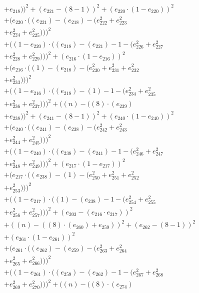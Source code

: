 \documentclass[10pt, a4paper]{article}
\begin{document}
\begin{small}
\begin{align*}
& + e_{218}))^{2} + (e_{221} - (8 - 1))^{2} + (e_{220}  \cdot  (1 - e_{220}))^{2} \\
& + (e_{220}  \cdot  ((e_{221}) - (e_{218}) - (e_{222}^{2} + e_{223}^{2} \\
& + e_{224}^{2} + e_{225}^{2})))^{2} \\
& + ((1 - e_{220})  \cdot  ((e_{218}) - (e_{221}) - 1 - (e_{226}^{2} + e_{227}^{2} \\
& + e_{228}^{2} + e_{229}^{2})))^{2} + (e_{216}  \cdot  (1 - e_{216}))^{2} \\
& + (e_{216}  \cdot  ((1) - (e_{218}) - (e_{230}^{2} + e_{231}^{2} + e_{232}^{2} \\
& + e_{233}^{2})))^{2} \\
& + ((1 - e_{216})  \cdot  ((e_{218}) - (1) - 1 - (e_{234}^{2} + e_{235}^{2} \\
& + e_{236}^{2} + e_{237}^{2})))^{2} + ((n) - ((8)  \cdot  (e_{239}) \\
& + e_{238}))^{2} + (e_{241} - (8 - 1))^{2} + (e_{240}  \cdot  (1 - e_{240}))^{2} \\
& + (e_{240}  \cdot  ((e_{241}) - (e_{238}) - (e_{242}^{2} + e_{243}^{2} \\
& + e_{244}^{2} + e_{245}^{2})))^{2} \\
& + ((1 - e_{240})  \cdot  ((e_{238}) - (e_{241}) - 1 - (e_{246}^{2} + e_{247}^{2} \\
& + e_{248}^{2} + e_{249}^{2})))^{2} + (e_{217}  \cdot  (1 - e_{217}))^{2} \\
& + (e_{217}  \cdot  ((e_{238}) - (1) - (e_{250}^{2} + e_{251}^{2} + e_{252}^{2} \\
& + e_{253}^{2})))^{2} \\
& + ((1 - e_{217})  \cdot  ((1) - (e_{238}) - 1 - (e_{254}^{2} + e_{255}^{2} \\
& + e_{256}^{2} + e_{257}^{2})))^{2} + (e_{203} - (e_{216}  \cdot  e_{217}))^{2} \\
& + ((n) - ((8)  \cdot  (e_{260}) + e_{259}))^{2} + (e_{262} - (8 - 1))^{2} \\
& + (e_{261}  \cdot  (1 - e_{261}))^{2} \\
& + (e_{261}  \cdot  ((e_{262}) - (e_{259}) - (e_{263}^{2} + e_{264}^{2} \\
& + e_{265}^{2} + e_{266}^{2})))^{2} \\
& + ((1 - e_{261})  \cdot  ((e_{259}) - (e_{262}) - 1 - (e_{267}^{2} + e_{268}^{2} \\
& + e_{269}^{2} + e_{270}^{2})))^{2} + ((n) - ((8)  \cdot  (e_{274}) \\

\end{align*}
\end{small}
\end{document}

